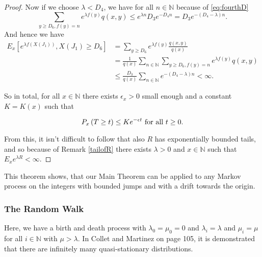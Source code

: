 \documentclass[12pt,a4paper]{scrartcl}
\numberwithin{equation}{section}
\newcommand{\N}{\mathbb{N}} %
\begin{document}
\begin{proof}
Now if we choose $\lambda < D_4$, we have for all $n \in \N$ because of \eqref{eq:fourthD} $$ \sum_{y \geq D_6, f\left(y\right) = n} e^{\lambda f\left(y\right)} q\left(x,y\right) \leq e^{\lambda n} D_3 e^{-D_4 n} = D_3 e^{-\left(D_4 - \lambda \right) n}. $$
And hence we have
\begin{align*}
E_x\left[e^{\lambda f\left(X\left(J_1\right) \right)}, X\left(J_1\right) \geq D_6 \right] &= \sum_{y \geq D_6} e^{\lambda f\left(y\right)} \frac{q\left(x,y\right)}{ q\left(x\right) } \\
&= \frac{1}{q\left(x\right)} \sum_{n \in \N} \sum_{y \geq D_6, f\left(y\right) = n} e^{\lambda f\left(y\right)} q\left(x,y\right) \\
&\leq \frac{D_3}{q\left(x\right)} \sum_{n \in \N} e^{-\left(D_4 - \lambda \right) n} < \infty. 
\end{align*}

So in total, for all $ x \in \N$ there exists $\epsilon_x > 0 $ small enough and a constant $K = K\left(x \right)$ such that

$$ P_x\left(T \geq t \right) \leq K e^{-\epsilon t} \textnormal{ for all } t \geq 0.$$

From this, it isn't difficult to follow that also $R$ has exponentially bounded tails, and so because of Remark \ref{tailofR} there exists $\lambda > 0$ and $ x \in \N$ such that $E_x e^{\lambda R} < \infty.$ 
\end{proof}

This theorem shows, that our Main Theorem can be applied to any Markov process on the integers with bounded jumps and with a drift towards the origin.

\subsubsection{The Random Walk} \label{examplerandomwalk}
Here, we have a birth and death process with $\lambda_0 = \mu_0 = 0$ and $\lambda_i = \lambda$ and $\mu_i = \mu$ for all $i \in \N$ with $ \mu > \lambda.$ In Collet and Martinez \cite{bookMartinez} on page 105, it is demonstrated that there are infinitely many quasi-stationary distributions. 
\end{document}

